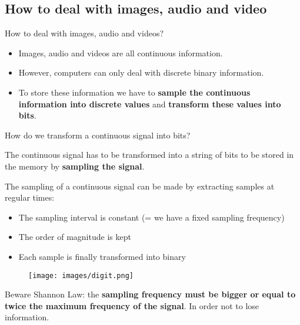 \documentclass[handout]{beamer}[10pt, usepdftitle=false]
\begin{document}
	\subsection{How to deal with images, audio and video}

	\begin{frame}

	How to deal with images, audio and videos?
	
	\vspace*{0.6em}
	
	\begin{itemize}
		\item{Images, audio and videos are all continuous information.}
		\item{However, computers can only deal with discrete binary information.}
		\item{To store these information we have to \textbf{sample the continuous information into discrete values} and \textbf{transform these values into bits}.}
	\end{itemize}

	\end{frame}
	
	\begin{frame}
	
	How do we transform a continuous signal into bits?
	\vspace*{0.6em}	
	
	The continuous signal has to be transformed into a string of bits to be stored in the memory by \textbf{sampling the signal}. 
	\vspace*{0.6em}		
	
	The sampling of a continuous signal can be made by extracting samples at regular times:
	
	\begin{itemize}
	\item{The sampling interval is constant (= we have a fixed sampling frequency)}
	\item{The order of magnitude is kept}
	\item{Each sample is finally transformed into binary}
	\end{itemize}
	
	\end{frame}
	
	\begin{frame}	
	
	\begin{center}	
	\begin{figure}
		\texttt{[image: images/digit.png]} 
	\end{figure}	
	\end{center}
	\vspace*{0.5em}	
	 
	
	
	\begin{alertblock}{Beware}
	Shannon Law: the \textbf{sampling frequency must be bigger or equal to twice the maximum frequency of the signal}.	In order not to lose information.
	\end{alertblock}
		
	
	\end{frame}
	
\end{document}
